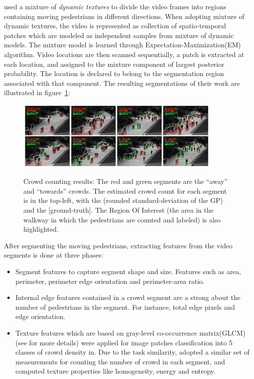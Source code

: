 \citeauthor*{chan2008privacy} used a mixture of \textit{dynamic textures}\cite{doretto2003dynamic, chan2008modeling} to divide the video frames into regions containing moving pedestrians in different directions. When adopting mixture of dynamic textures, the video is represented as collection of spatio-temporal patches which are modeled as independent samples from mixture of dynamic models\cite{doretto2003dynamic}. The mixture model is learned through Expectation-Maximization(EM) algorithm\cite{chan2008modeling}. Video locations are then scanned sequentially, a patch is extracted at each location, and assigned to the mixture component of largest posterior probability. The location is declared to belong to the segmentation region associated with that component\cite{chan2008privacy}. The resulting segmentations of their work are illustrated in figure~\ref{fig:segUcsd}:
\begin{figure}[H]
	\centering
	{\includegraphics[width=0.9\textwidth]{images/segUcsd}}
	\caption{Crowd counting results: The red and green segments are the “away” and “towards” crowds. The estimated crowd count for each segment is in the top-left, with the (rounded standard-deviation of the GP) and the [ground-truth]. The Region Of Interest (the area in the walkway in which the pedestrians are counted and labeled) is also highlighted\cite{chan2008privacy}.}
	\label{fig:segUcsd}
\end{figure}

After segmenting the moving pedestrians, extracting features from the video segments is done at three phases:
\begin{itemize}
	\item Segment features to capture segment shape and size. Features such as area, perimeter, perimeter edge orientation and perimeter-area ratio. 
	\item Internal edge features contained in a crowd segment are a strong about the number of pedestrians in the segment\cite{davies1995crowd, kong2005counting}. For instance, total edge pixels and edge orientation. 
	\item Texture features which are based on gray-level co-occurrence matrix(GLCM) (see \cite{haralick1973textural} for more details) were applied for image patches classification into 5 classes of crowd density in\cite{marana1998efficacy}. Due to the task similarity, \citeauthor*{chan2008privacy} adopted a similar set of measurements for counting the number of crowd in each segment, and computed texture properties like homogeneity, energy and entropy. 
\end{itemize} 

